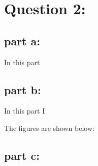 \documentclass[11pt,a4paper,english]{article}
\begin{document}
\section{Question 2:  }

   	
	\subsection{part a: }
	
	In this part 
	
	\subsection{part b: }
	
    In this part I 
    
    
    The figures are shown below:\\

    
   \subsection{part c: }
	
	
\end{document}
